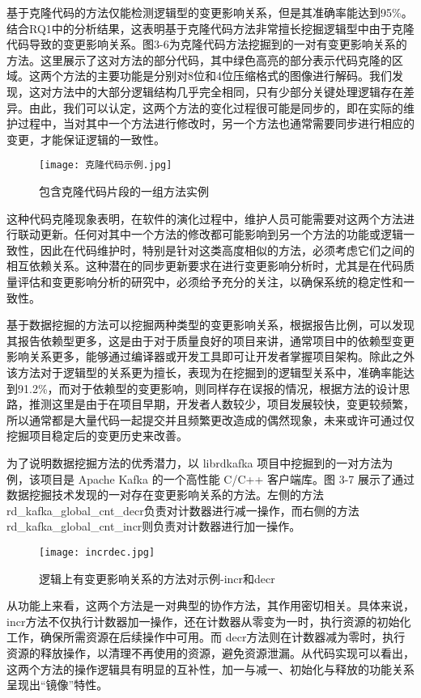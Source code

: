 基于克隆代码的方法仅能检测逻辑型的变更影响关系，但是其准确率能达到95\%。结合RQ1中的分析结果，这表明基于克隆代码方法非常擅长挖掘逻辑型中由于克隆代码导致的变更影响关系。图3-6为克隆代码方法挖掘到的一对有变更影响关系的方法。这里展示了这对方法的部分代码，其中绿色高亮的部分表示代码克隆的区域。这两个方法的主要功能是分别对8位和4位压缩格式的图像进行解码。我们发现，这对方法中的大部分逻辑结构几乎完全相同，只有少部分关键处理逻辑存在差异。由此，我们可以认定，这两个方法的变化过程很可能是同步的，即在实际的维护过程中，当对其中一个方法进行修改时，另一个方法也通常需要同步进行相应的变更，才能保证逻辑的一致性。

\begin{figure}[h]
\centering
\texttt{[image: 克隆代码示例.jpg]}
\caption{包含克隆代码片段的一组方法实例}
\end{figure}

这种代码克隆现象表明，在软件的演化过程中，维护人员可能需要对这两个方法进行联动更新。任何对其中一个方法的修改都可能影响到另一个方法的功能或逻辑一致性，因此在代码维护时，特别是针对这类高度相似的方法，必须考虑它们之间的相互依赖关系。这种潜在的同步更新要求在进行变更影响分析时，尤其是在代码质量评估和变更影响分析的研究中，必须给予充分的关注，以确保系统的稳定性和一致性。

基于数据挖掘的方法可以挖掘两种类型的变更影响关系，根据报告比例，可以发现其报告依赖型更多，这是由于对于质量良好的项目来讲，通常项目中的依赖型变更影响关系更多，能够通过编译器或开发工具即可让开发者掌握项目架构。除此之外该方法对于逻辑型的关系更为擅长，表现为在挖掘到的逻辑型关系中，准确率能达到91.2\%，而对于依赖型的变更影响，则同样存在误报的情况，根据方法的设计思路，推测这里是由于在项目早期，开发者人数较少，项目发展较快，变更较频繁，所以通常都是大量代码一起提交并且频繁更改造成的偶然现象，未来或许可通过仅挖掘项目稳定后的变更历史来改善。

为了说明数据挖掘方法的优秀潜力，以 librdkafka 项目中挖掘到的一对方法为例，该项目是 Apache Kafka 的一个高性能 C/C++ 客户端库。图 3-7 展示了通过数据挖掘技术发现的一对存在变更影响关系的方法。左侧的方法rd\_kafka\_global\_cnt\_decr负责对计数器进行减一操作，而右侧的方法rd\_kafka\_global\_cnt\_incr则负责对计数器进行加一操作。

\begin{figure}[h]
\centering
\texttt{[image: incrdec.jpg]}
\caption{逻辑上有变更影响关系的方法对示例-incr和decr}
\end{figure}

从功能上来看，这两个方法是一对典型的协作方法，其作用密切相关。具体来说，incr方法不仅执行计数器加一操作，还在计数器从零变为一时，执行资源的初始化工作，确保所需资源在后续操作中可用。而 decr方法则在计数器减为零时，执行资源的释放操作，以清理不再使用的资源，避免资源泄漏。从代码实现可以看出，这两个方法的操作逻辑具有明显的互补性，加一与减一、初始化与释放的功能关系呈现出“镜像”特性。

